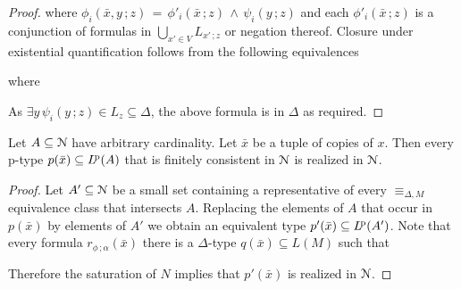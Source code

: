 \begin{proof}
  where $\phi_i(\bar x,y\,;z)\,=\,\phi'_i(\bar x\,;z)\,\wedge\,\psi_i(y\,;z)$ and each $\phi'_i(\bar x\,;z)$ is a conjunction of formulas in $\bigcup_{x'\in V} L_{x'\,;z}$ or negation thereof.
  Closure under existential quantification follows from the following equivalences









  where 
  

  As $\exists y\,\psi_i(y\,;z)\in L_z\subseteq\Delta$, the above formula is in $\Delta$ as required.
\end{proof}

\begin{fact}\label{fact_psat}
  Let $A\subseteq \EuScript N$ have arbitrary cardinality.
  Let $\bar x$ be a tuple of copies of $x$.
  Then every p-type $p(\bar x)\subseteq L^{\rm\! p}(A)$ that is finitely consistent in $\EuScript N$ is realized in $\EuScript N$.
\end{fact}

\begin{proof}
  Let $A'\subseteq\EuScript N$ be a small set containing a representative of every $\equiv_{\Delta,M}$ equivalence class that intersects $A$.
  Replacing the elements of $A$ that occur in $p(\bar x)$ by elements of $A'$ we obtain an equivalent type $p'(\bar x)\subseteq L^{\rm\! p}(A')$.
  Note that every formula $r_{\phi\,;\alpha}(\bar x)$ there is a $\Delta$-type $q(\bar x)\subseteq L(M)$ such that


  Therefore the saturation of $N$ implies that $p'(\bar x)$ is realized in $\EuScript N$.
\end{proof}

